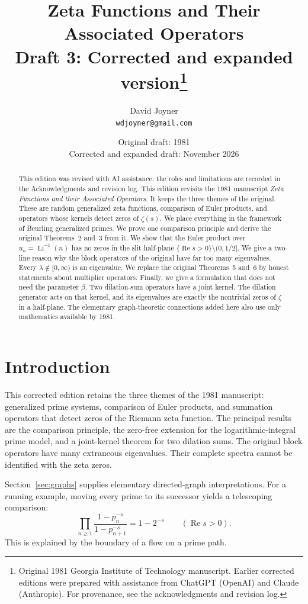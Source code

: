 \documentclass[12pt,letterpaper]{article}
\title{Zeta Functions and Their Associated Operators\\[0.3em]
\large Draft 3: Corrected and expanded version\thanks{Original 1981 Georgia Institute of Technology manuscript. Earlier corrected editions were prepared with assistance from ChatGPT (OpenAI) and Claude (Anthropic). For provenance, see the acknowledgments and revision log.}}
\author{David Joyner\\[0.2em]\normalsize\texttt{wdjoyner@gmail.com}}
\date{Original draft: 1981\\Corrected and expanded draft: November 2026}
\theoremstyle{definition}
\theoremstyle{remark}
\newcommand{\Li}{\operatorname{Li}}
\newcommand{\Ree}{\operatorname{Re}}
\begin{document}
\maketitle

\begin{abstract}
This edition was revised with AI assistance; the roles and limitations are recorded in the Acknowledgments and revision log.
This edition revisits the 1981 manuscript \emph{Zeta Functions and their
Associated Operators}. It keeps the three themes of the original. These are
random generalized zeta functions, comparison of Euler products, and
operators whose kernels detect zeros of $\zeta(s)$. We place everything in
the framework of Beurling generalized primes. We prove one comparison
principle and derive the original Theorems~2 and~3 from it. We show that
the Euler product over $u_n=\Li^{-1}(n)$ has no zeros in the slit half-plane
$\{\Ree s>0\}\setminus(0,1/2]$. We give a two-line reason why the block
operators of the original have far too many eigenvalues. Every
$\lambda\notin[0,\infty)$ is an eigenvalue. We replace the original
Theorems~5 and~6 by honest statements about multiplier operators. Finally,
we give a formulation that does not need the parameter $\beta$. Two
dilation-sum operators have a joint kernel. The dilation generator acts on
that kernel, and its eigenvalues are exactly the nontrivial zeros of
$\zeta$ in a half-plane. The elementary graph-theoretic connections added here also use only mathematics available by 1981.
\end{abstract}

\tableofcontents

\section{Introduction}\label{sec:introduction}
This corrected edition retains the three themes of the 1981
manuscript: generalized prime systems, comparison of Euler
products, and summation operators that detect zeros of the
Riemann zeta function. The principal results are the comparison
principle, the zero-free extension for the logarithmic-integral
prime model, and a joint-kernel theorem for two dilation sums.
The original block operators have many extraneous eigenvalues.
Their complete spectra cannot be identified with the zeta zeros.

Section~\ref{sec:graphs} supplies elementary directed-graph
interpretations. For a running example, moving every prime
to its successor yields a telescoping comparison:
\begin{equation}\label{eq:intro-telescope}
 \prod_{n\ge1}\frac{1-p_n^{-s}}{1-p_{n+1}^{-s}}
 =1-2^{-s}\qquad (\Ree s>0).
\end{equation}
This is explained by the boundary of a flow on a prime path.
\end{document}
